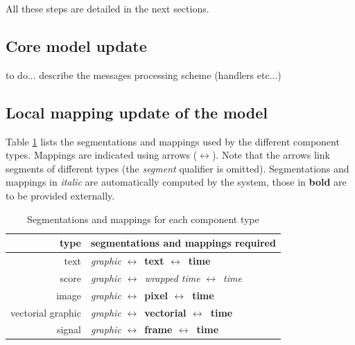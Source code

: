 \documentclass[a4paper]{article}
\newcommand{\lra}			{$\leftrightarrow$}
\begin{document}
All these steps are detailed in the next sections.


\subsection{Core model update}
to do... describe the messages processing scheme (handlers etc...)


\subsection{Local mapping update of the model}

Table \ref{maptable} lists the segmentations and mappings used by the different component types. Mappings are indicated using arrows (\lra). Note that the arrows link segments of different types (the \emph{segment} qualifier is omitted). Segmentations and mappings in  \textit{italic} are automatically computed by the system, those in \textbf{bold} are to be provided externally.

\begin{table}[htdp]
\begin{center}
\begin{tabular}{|r|l|}
\hline
type & segmentations and mappings required \\
\hline
text		& \textit{graphic} \lra\ \textbf{text  \lra\ time} \\
score		& \textit{graphic \lra\ wrapped time} \lra\ \textit{time} \\
image		& \textit{graphic} \lra\ \textbf{pixel \lra\ time} \\
vectorial graphic	&  \textit{graphic} \lra\ \textbf{vectorial \lra\ time} \\
signal		&  \textit{graphic} \lra\ \textbf{frame \lra\ time} \\
\hline
\end{tabular}
\end{center}
\caption{Segmentations and mappings for each component type}
\label{maptable}
\end{table}
\end{document}
